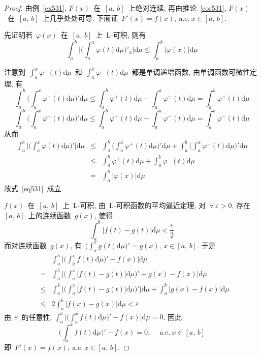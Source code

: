 \begin{proof}
由例~\ref{ex531}, $F(x)$~在~$[a,\,b]$~上绝对连续, 再由推论~\ref{cor531}, $F(x)$~在~$[a,\,b]$~上几乎处处可导. 下面证~$F'(x) = f(x), \mathrm{~a.e.~} x \in [a,\,b]$.

先证明若~$\varphi(x)$~在~$[a,\,b]$~上~L-可积, 则有
\begin{equation} \label{eq531}
\int_a^b \Big| \Big( \int_a^x \varphi(t) \mathrm{d} \mu \Big)'_x \Big| \mathrm{d} \mu \leqslant \int_a^b \big| \varphi(x) \big| \mathrm{d} \mu
\end{equation}

注意到~$\int_a^x \varphi^+(t) \mathrm{d} \mu$~和~$\int_a^x \varphi^-(t) \mathrm{d} \mu$~都是单调递增函数, 由单调函数可微性定理, 有
\[
\int_a^b \Big( \int_a^x \varphi^+(t) \mathrm{d} \mu \Big)' \mathrm{d} \mu \leqslant \int_a^b \varphi^+(t) \mathrm{d} \mu - \int_a^a \varphi^+(t) \mathrm{d} \mu = \int_a^b \varphi^+(t) \mathrm{d} \mu
\]
\[
\int_a^b \Big( \int_a^x \varphi^-(t) \mathrm{d} \mu \Big)' \mathrm{d} \mu \leqslant \int_a^b \varphi^-(t) \mathrm{d} \mu - \int_a^a \varphi^-(t) \mathrm{d} \mu = \int_a^b \varphi^-(t) \mathrm{d} \mu
\]
从而
\begin{eqnarray*}
\int_a^b \Big| \Big( \int_a^x \varphi(t) \mathrm{d} \mu \Big)' \Big| \mathrm{d} \mu &\leqslant& \int_a^b \Big( \int_a^x \varphi^+(t) \mathrm{d} \mu \Big)' \mathrm{d} \mu + \int_a^b \Big( \int_a^x \varphi^-(t) \mathrm{d} \mu \Big)' \mathrm{d} \mu \\
&\leqslant& \int_a^b \varphi^+(t) \mathrm{d} \mu + \int_a^b \varphi^-(t) \mathrm{d} \mu \\
&=& \int_a^b \big| \varphi(x) \big| \mathrm{d} \mu
\end{eqnarray*}
故式~\eqref{eq531}~成立.

$f(x)$~在~$[a,\,b]$~上~L-可积, 由~L-可积函数的平均逼近定理, 对~$\forall~\varepsilon > 0$, 存在~$[a,\,b]$~上的连续函数~$g(x)$, 使得
\[
\int_a^b \big|f(t)-g(t)\big| \mathrm{d} \mu < \frac{\varepsilon}{2}
\]
而对连续函数~$g(x)$, 有~$\big( \int_a^x g(t) \mathrm{d} \mu \big)' = g(x), \, x \in [a,\,b]$. 于是
\begin{eqnarray*}
&&\int_a^b \Big| \Big( \int_a^x f(t) \mathrm{d} \mu \Big)' - f(x) \Big| \mathrm{d} \mu \\
&=& \int_a^b \Big| \Big( \int_a^x \big[f(t) - g(t)\big] \mathrm{d} \mu \Big)' + g(x) - f(x) \Big| \mathrm{d} \mu \\
&\leqslant& \int_a^b \Big| \Big( \int_a^x \big[f(t) - g(t)\big] \mathrm{d} \mu \Big)' \Big| \mathrm{d} \mu + \int_a^b \big|g(x) - f(x)\big| \mathrm{d} \mu \\
&\leqslant& 2\int_a^b \big| f(x)-g(x) \big| \mathrm{d} \mu < \varepsilon
\end{eqnarray*}
由~$\varepsilon$~的任意性, $\int_a^b \big|\big( \int_a^x f(t) \mathrm{d} \mu \big)' - f(x) \big| \mathrm{d} \mu = 0$. 因此
\[
\Big( \int_a^x f(t) \mathrm{d} \mu \Big)' - f(x) = 0, \quad \mathrm{~a.e.~} x \in [a,\,b]
\]
即~$F'(x) = f(x), \mathrm{~a.e.~} x \in [a,\,b]$.
\end{proof}

